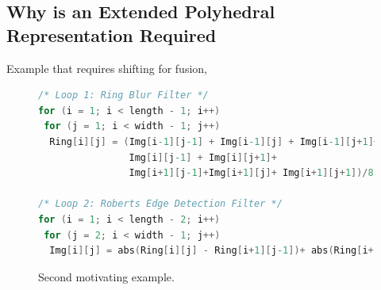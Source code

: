 




\subsection{Why is an Extended Polyhedral Representation Required}

Example that requires shifting for fusion,

\begin{figure}[ht]

\begin{lstlisting}[language=C,escapechar=@]
/* Loop 1: Ring Blur Filter */
for (i = 1; i < length - 1; i++)
 for (j = 1; i < width - 1; j++)
  Ring[i][j] = (Img[i-1][j-1] + Img[i-1][j] + Img[i-1][j+1]+
                Img[i][j-1] + Img[i][j+1]+
                Img[i+1][j-1]+Img[i+1][j]+ Img[i+1][j+1])/8;

/* Loop 2: Roberts Edge Detection Filter */
for (i = 1; i < length - 2; i++)
 for (j = 2; i < width - 1; j++)
  Img[i][j] = abs(Ring[i][j] - Ring[i+1][j-1])+ abs(Ring[i+1][j] - Ring[i][j-1]);

\end{lstlisting}

\caption{\label{fig:motivating:example2} Second motivating example.}
\end{figure}


